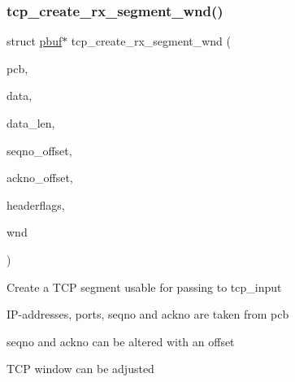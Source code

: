\subsubsection{\texorpdfstring{tcp\+\_\+create\+\_\+rx\+\_\+segment\+\_\+wnd()}{tcp\_create\_rx\_segment\_wnd()}}
{\footnotesize\ttfamily struct \hyperlink{structpbuf}{pbuf}$\ast$ tcp\+\_\+create\+\_\+rx\+\_\+segment\+\_\+wnd (\begin{DoxyParamCaption}\item[{struct tcp\+\_\+pcb $\ast$}]{pcb,  }\item[{void $\ast$}]{data,  }\item[{size\+\_\+t}]{data\+\_\+len,  }\item[{\hyperlink{group__compiler__abstraction_ga4c14294869aceba3ef9d4c0c302d0f33}{u32\+\_\+t}}]{seqno\+\_\+offset,  }\item[{\hyperlink{group__compiler__abstraction_ga4c14294869aceba3ef9d4c0c302d0f33}{u32\+\_\+t}}]{ackno\+\_\+offset,  }\item[{\hyperlink{group__compiler__abstraction_ga4caecabca98b43919dd11be1c0d4cd8e}{u8\+\_\+t}}]{headerflags,  }\item[{\hyperlink{group__compiler__abstraction_ga77570ac4fcab86864fa1916e55676da2}{u16\+\_\+t}}]{wnd }\end{DoxyParamCaption})}

Create a T\+CP segment usable for passing to tcp\+\_\+input
\begin{DoxyItemize}
\item I\+P-\/addresses, ports, seqno and ackno are taken from pcb
\item seqno and ackno can be altered with an offset
\item T\+CP window can be adjusted 
\end{DoxyItemize}\mbox{\label{openmote-cc2538_2lwip_2test_2unit_2tcp_2tcp__helper_8h_aa6f4b7b087e8641f6c178d8752cc4fab}} 
